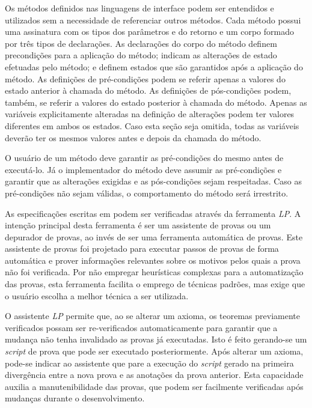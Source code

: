 Os métodos definidos nas linguagens de interface podem ser entendidos e utilizados sem a necessidade de referenciar outros métodos.
Cada método possui uma assinatura com os tipos dos parâmetros e do retorno e um corpo formado por três tipos de declarações.
As declarações do corpo do método definem precondições para a aplicação do método; indicam as alterações de estado efetuadas pelo método; e definem estados que são garantidos após a aplicação do método.
As definições de pré-condições podem se referir apenas a valores do estado anterior à chamada do método.
As definições de pós-condições podem, também, se referir a valores do estado posterior à chamada do método.
Apenas as variáveis explicitamente alteradas na definição de alterações podem ter valores diferentes em ambos os estados.
Caso esta seção seja omitida, todas as variáveis deverão ter os mesmos valores antes e depois da chamada do método.

O usuário de um método deve garantir as pré-condições do mesmo antes de executá-lo.
Já o implementador do método deve assumir as pré-condições e garantir que as alterações exigidas e as pós-condições sejam respeitadas.
Caso as pré-condições não sejam válidas, o comportamento do método será irrestrito.

As especificações escritas em \Larch podem ser verificadas através da ferramenta \textit{LP}.
A intenção principal desta ferramenta é ser um assistente de provas ou um depurador de provas, ao invés de ser uma ferramenta automática de provas.
Este assistente de provas foi projetado para executar passos de provas de forma automática e prover informações relevantes sobre os motivos pelos quais a prova não foi verificada.
Por não empregar heurísticas complexas para a automatização das provas, esta ferramenta facilita o emprego de técnicas padrões, mas exige que o usuário escolha a melhor 
técnica a ser utilizada.

O assistente \textit{LP} permite que, ao se alterar um axioma, os teoremas previamente verificados possam ser re-verificados automaticamente para garantir que a mudança não tenha invalidado as provas já executadas.
Isto é feito gerando-se um \textit{script} de prova que pode ser executado posteriormente.
Após alterar um axioma, pode-se indicar ao assistente que pare a execução do \textit{script} gerado na primeira divergência entre a nova prova e as anotações da prova anterior.
Esta capacidade auxilia a manutenibilidade das provas, que podem ser facilmente verificadas após mudanças durante o desenvolvimento.

